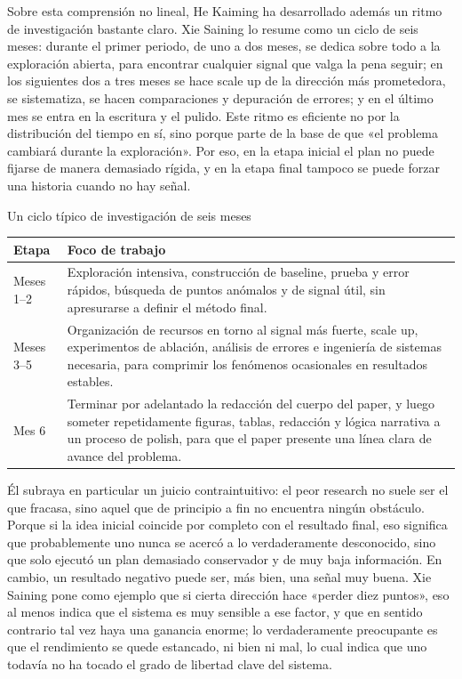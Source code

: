 Sobre esta comprensión no lineal, He Kaiming ha desarrollado además un ritmo de investigación bastante claro. Xie Saining lo resume como un ciclo de seis meses: durante el primer periodo, de uno a dos meses, se dedica sobre todo a la exploración abierta, para encontrar cualquier signal que valga la pena seguir; en los siguientes dos a tres meses se hace scale up de la dirección más prometedora, se sistematiza, se hacen comparaciones y depuración de errores; y en el último mes se entra en la escritura y el pulido. Este ritmo es eficiente no por la distribución del tiempo en sí, sino porque parte de la base de que «el problema cambiará durante la exploración». Por eso, en la etapa inicial el plan no puede fijarse de manera demasiado rígida, y en la etapa final tampoco se puede forzar una historia cuando no hay señal.

\begin{knowledgebox}{Un ciclo típico de investigación de seis meses}
\begin{tabularx}{\textwidth}{>{\raggedright\arraybackslash}p{} Y}
\toprule
Etapa & Foco de trabajo \\
\midrule
Meses 1--2 & Exploración intensiva, construcción de baseline, prueba y error rápidos, búsqueda de puntos anómalos y de signal útil, sin apresurarse a definir el método final. \\
Meses 3--5 & Organización de recursos en torno al signal más fuerte, scale up, experimentos de ablación, análisis de errores e ingeniería de sistemas necesaria, para comprimir los fenómenos ocasionales en resultados estables. \\
Mes 6 & Terminar por adelantado la redacción del cuerpo del paper, y luego someter repetidamente figuras, tablas, redacción y lógica narrativa a un proceso de polish, para que el paper presente una línea clara de avance del problema. \\
\bottomrule
\end{tabularx}
\end{knowledgebox}

Él subraya en particular un juicio contraintuitivo: el peor research no suele ser el que fracasa, sino aquel que de principio a fin no encuentra ningún obstáculo. Porque si la idea inicial coincide por completo con el resultado final, eso significa que probablemente uno nunca se acercó a lo verdaderamente desconocido, sino que solo ejecutó un plan demasiado conservador y de muy baja información. En cambio, un resultado negativo puede ser, más bien, una señal muy buena. Xie Saining pone como ejemplo que si cierta dirección hace «perder diez puntos», eso al menos indica que el sistema es muy sensible a ese factor, y que en sentido contrario tal vez haya una ganancia enorme; lo verdaderamente preocupante es que el rendimiento se quede estancado, ni bien ni mal, lo cual indica que uno todavía no ha tocado el grado de libertad clave del sistema.

